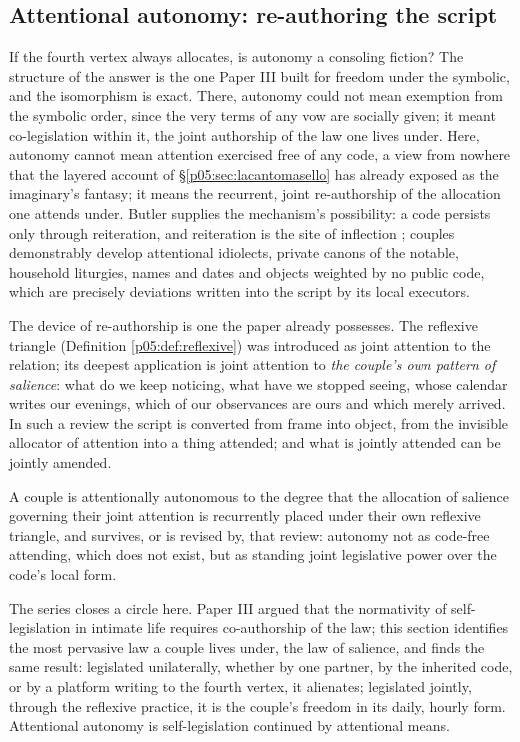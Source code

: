 \subsection{Attentional autonomy: re-authoring the script}
\label{p05:sec:autonomy}

If the fourth vertex always allocates, is autonomy a consoling fiction? The structure of the answer is the one Paper III built for freedom under the symbolic, and the isomorphism is exact. There, autonomy could not mean exemption from the symbolic order, since the very terms of any vow are socially given; it meant co-legislation within it, the joint authorship of the law one lives under. Here, autonomy cannot mean attention exercised free of any code, a view from nowhere that the layered account of §\ref{p05:sec:lacantomasello} has already exposed as the imaginary's fantasy; it means the recurrent, joint re-authorship of the allocation one attends under. Butler supplies the mechanism's possibility: a code persists only through reiteration, and reiteration is the site of inflection \parencite{butler1997}; couples demonstrably develop attentional idiolects, private canons of the notable, household liturgies, names and dates and objects weighted by no public code, which are precisely deviations written into the script by its local executors.

The device of re-authorship is one the paper already possesses. The reflexive triangle (Definition \ref{p05:def:reflexive}) was introduced as joint attention to the relation; its deepest application is joint attention to \emph{the couple's own pattern of salience}: what do we keep noticing, what have we stopped seeing, whose calendar writes our evenings, which of our observances are ours and which merely arrived. In such a review the script is converted from frame into object, from the invisible allocator of attention into a thing attended; and what is jointly attended can be jointly amended.

\begin{defn}\label{p05:def:autonomy}
A couple is attentionally autonomous to the degree that the allocation of salience governing their joint attention is recurrently placed under their own reflexive triangle, and survives, or is revised by, that review: autonomy not as code-free attending, which does not exist, but as standing joint legislative power over the code's local form.
\end{defn}

The series closes a circle here. Paper III argued that the normativity of self-legislation in intimate life requires co-authorship of the law; this section identifies the most pervasive law a couple lives under, the law of salience, and finds the same result: legislated unilaterally, whether by one partner, by the inherited code, or by a platform writing to the fourth vertex, it alienates; legislated jointly, through the reflexive practice, it is the couple's freedom in its daily, hourly form. Attentional autonomy is self-legislation continued by attentional means.

